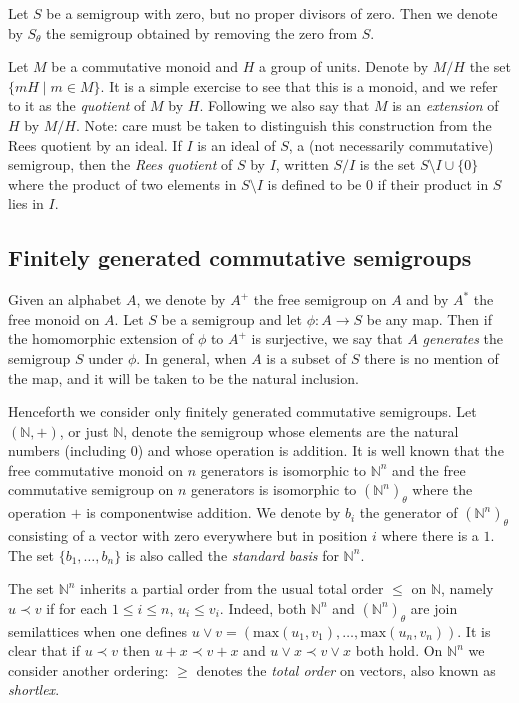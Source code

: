 \documentclass[12pt]{article}
\def\N{{\mathbb{N}}}
\def\max{{\mbox{max}}}
\begin{document}
Let $S$ be a semigroup with zero, but no proper divisors of zero.
Then we denote by $S_\theta$ the semigroup obtained by removing the
zero from $S$.

Let $M$ be a commutative monoid and $H$ a group of units.
Denote by $M/H$ the set $\{mH \mid m \in M\}$. It is a simple exercise
to see that this is a monoid, and we refer to it as the 
{\em quotient} of $M$ by $H$. Following  \cite{pDJW91}
we also say that $M$ is an {\em extension} of $H$ by $M/H$.
Note: care must be taken to distinguish this construction from 
the Rees quotient by an ideal. If $I$ is an ideal of $S$, a (not necessarily
commutative) semigroup, then the \emph{Rees quotient} of $S$ by $I$, 
written $S/I$ is the set $S \setminus I \cup \{0\}$ where 
the product of two elements in  $S \setminus I$ 
is defined to be $0$ if their product in $S$ lies in $I$.

\subsection{Finitely generated commutative semigroups}

Given an alphabet $A$, we denote by $A^+$ the free semigroup on $A$
and by $A^*$ the free monoid on $A$. Let $S$ be a semigroup and let
$\phi: A \rightarrow S$ be any map. 
Then if the homomorphic extension of
$\phi$ to $A^+$ is surjective, we say that $A$ 
{\em generates} the semigroup $S$ under $\phi$.
In general, when $A$ is a subset of $S$
there is no mention of the map, and it will be 
taken to be the natural inclusion.

Henceforth we consider only finitely generated commutative semigroups.
Let $(\N, +)$, or just $\N$,  denote the  semigroup whose
elements are the natural numbers (including 0) and whose operation is
addition. It is well known that the 
free commutative monoid on  $n$ generators is isomorphic to $\N^n$  
and the free commutative semigroup on $n$ generators is isomorphic to 
$(\N^n)_\theta$ where the operation $+$ is componentwise addition. 
We denote by $b_i$ the generator of $(\N^n)_\theta$ consisting of
a vector with zero everywhere but in position $i$ where there is a 
$1$. The set $\{b_1, \ldots, b_n\}$ is also called the {\em standard basis}
for $\N^n$.

The set $\N^n$ inherits a partial order from the
usual total order $\leq$ on $\mathbb{N}$, namely
$u \prec v$ if for each $1 \leq i \leq n$, $u_i \leq v_i$.
Indeed, both $\N^n$ and $(\N^n)_\theta$ are join semilattices when
one defines $u \vee v = (\max(u_1, v_1), \ldots, \max(u_n,v_n))$.
It is clear that if $u \prec v$ then $u + x \prec v + x$ and
$u \vee x \prec v \vee x$ both hold.
On $\mathbb{N}^n$ we consider another ordering: $\geq$ denotes
the \emph{total order} on vectors, also known as \emph{shortlex}. 
\end{document}
